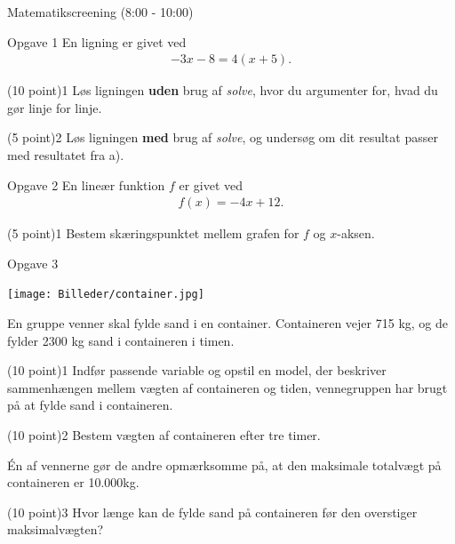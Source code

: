 
\begin{center}
\LARGE
Matematikscreening (8:00 - 10:00)
\end{center}


\begin{opgavetekst}{Opgave 1}
	En ligning er givet ved
	\begin{align*}
		-3x-8 = 4(x+5).
	\end{align*}
\end{opgavetekst}
\begin{delopgave}{(10 point)}{1}
	Løs ligningen \textbf{uden} brug af \textit{solve}, hvor du argumenter for, hvad du gør linje for linje.
\end{delopgave}
\begin{delopgave}{(5 point)}{2}
	Løs ligningen \textbf{med} brug af \textit{solve}, og undersøg om dit resultat passer med resultatet fra a).
\end{delopgave}

\begin{opgavetekst}{Opgave 2}
	En lineær funktion $f$ er givet ved
	\begin{align*}
		f(x) = -4x+12.
	\end{align*}
\end{opgavetekst}
\begin{delopgave}{(5 point)}{1}
	Bestem skæringspunktet mellem grafen for $f$ og $x$-aksen. 
\end{delopgave}
\newpage
\begin{opgavetekst}{Opgave 3}
	\begin{center}
		\texttt{[image: Billeder/container.jpg]}
	\end{center}
	En gruppe venner skal fylde sand i en container. Containeren vejer 715 kg, og de fylder 2300 kg sand i containeren i timen. 
\end{opgavetekst}
\begin{delopgave}{(10 point)}{1}
	Indfør passende variable og opstil en model, der beskriver sammenhængen mellem vægten af containeren og tiden, vennegruppen har brugt på at fylde sand i containeren. 
\end{delopgave}
\begin{delopgave}{(10 point)}{2}
	Bestem vægten af containeren efter tre timer. 
\end{delopgave}
\begin{meretekst}
	Én af vennerne gør de andre opmærksomme på, at den maksimale totalvægt på containeren er 10.000kg.
\end{meretekst}
\begin{delopgave}{(10 point)}{3}
	Hvor længe kan de fylde sand på containeren før den overstiger maksimalvægten?
\end{delopgave}

